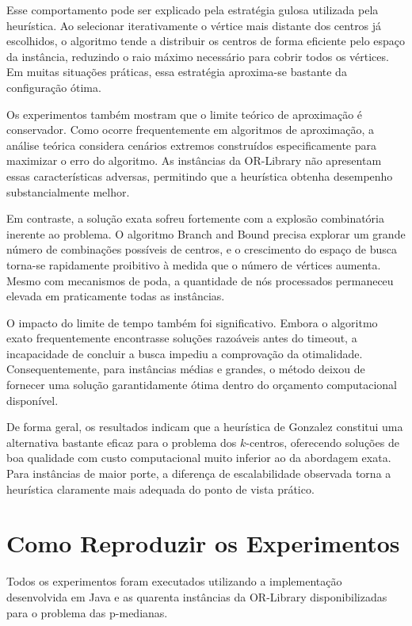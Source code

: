\documentclass[12pt]{article}
\begin{document}
Esse comportamento pode ser explicado pela estratégia gulosa utilizada pela heurística. Ao selecionar iterativamente o vértice mais distante dos centros já escolhidos, o algoritmo tende a distribuir os centros de forma eficiente pelo espaço da instância, reduzindo o raio máximo necessário para cobrir todos os vértices. Em muitas situações práticas, essa estratégia aproxima-se bastante da configuração ótima.

Os experimentos também mostram que o limite teórico de aproximação é conservador. Como ocorre frequentemente em algoritmos de aproximação, a análise teórica considera cenários extremos construídos especificamente para maximizar o erro do algoritmo. As instâncias da OR-Library não apresentam essas características adversas, permitindo que a heurística obtenha desempenho substancialmente melhor.

Em contraste, a solução exata sofreu fortemente com a explosão combinatória inerente ao problema. O algoritmo Branch and Bound precisa explorar um grande número de combinações possíveis de centros, e o crescimento do espaço de busca torna-se rapidamente proibitivo à medida que o número de vértices aumenta. Mesmo com mecanismos de poda, a quantidade de nós processados permaneceu elevada em praticamente todas as instâncias.

O impacto do limite de tempo também foi significativo. Embora o algoritmo exato frequentemente encontrasse soluções razoáveis antes do timeout, a incapacidade de concluir a busca impediu a comprovação da otimalidade. Consequentemente, para instâncias médias e grandes, o método deixou de fornecer uma solução garantidamente ótima dentro do orçamento computacional disponível.

De forma geral, os resultados indicam que a heurística de Gonzalez constitui uma alternativa bastante eficaz para o problema dos $k$-centros, oferecendo soluções de boa qualidade com custo computacional muito inferior ao da abordagem exata. Para instâncias de maior porte, a diferença de escalabilidade observada torna a heurística claramente mais adequada do ponto de vista prático.

\section{Como Reproduzir os Experimentos}

Todos os experimentos foram executados utilizando a implementação desenvolvida em Java e as quarenta instâncias da OR-Library disponibilizadas para o problema das p-medianas.
\end{document}
